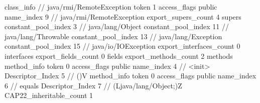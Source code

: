 {{{		}
		class_info {		// java/rmi/RemoteException
			token	1
			access_flags	public
			name_index	9		// java/rmi/RemoteException
			export_supers_count	4
			supers {
				constant_pool_index	3		// java/lang/Object
				constant_pool_index	11		// java/lang/Throwable
				constant_pool_index	13		// java/lang/Exception
				constant_pool_index	15		// java/io/IOException
			}
			export_interfaces_count	0
			interfaces {
			}
			export_fields_count	0
			fields {
			}
			export_methods_count	2
			methods {
				method_info {
					token	0
					access_flags	public
					name_index	4		// <init>
					Descriptor_Index	5		// ()V
				}
				method_info {
					token	0
					access_flags	public
					name_index	6		// equals
					Descriptor_Index	7		// (Ljava/lang/Object;)Z
				}
			}
			CAP22_inheritable_count	1
		}
	}
}
